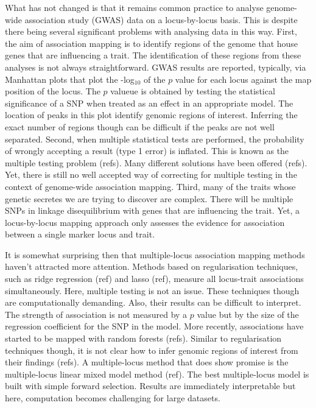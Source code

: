 \documentclass{article}
\begin{document}
What has not changed is that it remains common practice to analyse genome-wide association study (GWAS) data on a locus-by-locus basis. This is despite there being several significant problems with analysing data in this way. 
First, the aim of association mapping is to identify regions of the genome that house genes that are influencing a trait. 
The identification of these regions from these analyses is not always straightforward. GWAS results are reported, typically, via Manhattan plots 
that plot the -log$_{10}$ of the $p$ value for each locus against the map position of the locus. The $p$ valueue is obtained by testing the statistical 
significance of a SNP when treated as an effect in an appropriate model. 
The location of peaks in this plot identify genomic 
regions of interest. Inferring the exact number of regions though can be difficult if the peaks are not well separated. Second, when multiple statistical tests are performed, the probability of wrongly accepting a result (type 1 error) is inflated. This is known as the multiple testing problem (refs). Many different solutions have been offered (refs). Yet, there is still no well accepted way of correcting for multiple testing in the context of genome-wide association mapping. Third, many of the traits whose genetic secretes we are trying to discover are complex. There will be multiple SNPs in linkage disequilibrium with genes that are influencing the trait. Yet, a locus-by-locus mapping approach only assesses the evidence for association between a single marker locus and trait.

It is somewhat surprising then that multiple-locus association mapping methods haven't attracted more attention. Methods based on 
regularisation techniques, such as ridge regression (ref) and lasso (ref), measure all locus-trait associations simultaneously. 
Here, multiple testing is not an issue. These techniques though are computationally demanding. Also, their results can be difficult to interpret. The strength of association is not measured by a $p$ value but by the size of the regression coefficient for the SNP in the model. More recently, associations have started to be mapped with random forests (refs). Similar to regularisation techniques though, it is not clear how to infer genomic regions of interest from their findings (refs). A multiple-locus method that does show promise is the multiple-locus linear mixed model method (ref). The best multiple-locus model is built with simple forward selection. Results are immediately interpretable but here, computation becomes challenging for large datasets. 
\end{document}
